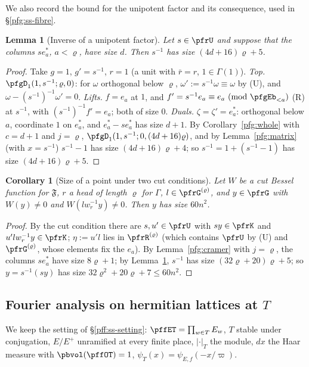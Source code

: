 \documentclass[10pt]{amsart}
\newtheorem{lemma}[theorem]{Lemma}
\newtheorem{corollary}[theorem]{Corollary}
\theoremstyle{definition}
\theoremstyle{remark}
\begin{document}
We also record the bound for the unipotent factor and its consequence, used in \S\ref{pfg:ss-fibre}.

\begin{lemma}[Inverse of a unipotent factor]\label{pfg:unipinv}
Let $s\in\pfrU$ and suppose that the columns $se^*_a$, $a<\varrho$, have size $d$. Then $s^{-1}$ has size
$(4d+16)\varrho+5$.
\end{lemma}
\begin{proof}
Take $g=1$, $g'=s^{-1}$, $r=1$ (a unit with $\bar r=r$, $1\in\Gamma(1)$). \emph{Top.} $\pfgD_1(1,s^{-1};\varrho,0)$:
for $\omega$ orthogonal below $\varrho$, $\omega':=s^{-1}\omega\equiv\omega$ by (U), and $\omega-(s^{-1})^{-1}\omega'=0$.
\emph{Lifts.} $f=e_a$ at $1$, and $f'=s^{-1}e_a\equiv e_a\ (\mathrm{mod}\ \pfgEb_{<a})$ (R) at $s^{-1}$, with
$(s^{-1})^{-1}f'=e_a$; both of size $0$. \emph{Duals.} $\zeta=\zeta'=e^*_a$: orthogonal below $a$, coordinate $1$
on $e^*_a$, and $e^*_a-se^*_a$ has size $d+1$. By Corollary~\ref{pfg:whole} with $c=d+1$ and $j=\varrho$,
$\pfgD_1(1,s^{-1};0,(4d+16)\varrho)$, and by Lemma~\ref{pfg:matrix} (with $x=s^{-1}$) $s^{-1}-1$ has size
$(4d+16)\varrho+4$; so $s^{-1}=1+(s^{-1}-1)$ has size $(4d+16)\varrho+5$.
\end{proof}

\begin{corollary}[Size of a point under two cut conditions]\label{pfg:sizehead}
Let $W$ be a cut Bessel function for $\mathfrak F$, $r$ a head of length $\varrho$ for $\Gamma$, $l\in\pfrG^{(\varrho)}$,
and $y\in\pfrG$ with $W(y)\ne0$ and $W(lw_r^{-1}y)\ne0$. Then $y$ has size $60n^2$.
\end{corollary}
\begin{proof}
By the cut condition there are $s,u'\in\pfrU$ with $sy\in\pfrK$ and $u'lw_r^{-1}y\in\pfrK$; $\eta:=u'l$ lies in
$\pfrR^{(\varrho)}$ (which contains $\pfrU$ by (U) and $\pfrG^{(\varrho)}$, whose elements fix the $e_a$). By
Lemma~\ref{pfg:cramer} with $j=\varrho$, the columns $se^*_a$ have size $8\varrho+1$; by Lemma~\ref{pfg:unipinv},
$s^{-1}$ has size $(32\varrho+20)\varrho+5$; so $y=s^{-1}(sy)$ has size $32\varrho^2+20\varrho+7\le60n^2$.
\end{proof}

\subsection{Fourier analysis on hermitian lattices at $T$}\label{pfg:ss-fourier}

We keep the setting of \S\ref{pff:ss-setting}: $\pffET=\prod_{w\in T}E_w$, $T$ stable under conjugation,
$E/E^+$ unramified at every finite place, $|\cdot|_T$ the module, $dx$ the Haar measure with
$\pbvol(\pffOT)=1$, $\psi_T(x)=\psi_{E,f}(-x/\varpi)$.
\end{document}
